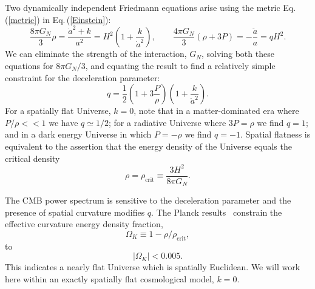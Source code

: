 \documentclass[universe,article,submit,moreauthors,pdftex,a4paper]{Definitions/mdpi}
\newcommand{\beqn}{\begin{equation}}
\newcommand{\eeqn}{\end{equation}}
\newcommand{\req}[1]{Eq.\,(\ref{#1})}
\begin{document}
Two dynamically independent Friedmann equations \cite{weinberg1972gravitation} arise using the metric \req{metric} in \req{Einstein}:
\beqn\label{hubble}
\frac{8\pi G_N}{3} \rho =  \frac{\dot a^2+k}{a^2}
=H^2\left( 1+\frac { k }{\dot a^2}\right),
\qquad
\frac{4\pi G_N}{3} (\rho+3P)  =-\frac{\ddot a}{a}=qH^2.
\eeqn
We can eliminate the strength of the interaction, $G_N$,  solving both these equations for ${8\pi G_N}/{3}$, and equating the result to find a relatively simple constraint for the deceleration parameter:
\beqn\label{qparam}
q=\frac 1 2 \left(1+3\frac{P}{\rho}\right)\left(1+\frac{k}{\dot a^2}\right).
\eeqn
For a spatially flat Universe, $k=0$, note that in a  matter-dominated era where $P/\rho<<1$ we have $q\simeq 1/2$; for a radiative Universe where $3P=\rho$ we find $q= 1 $; and  in a dark energy Universe in which $P=-\rho$  we find $q=-1$.  Spatial flatness is equivalent to the assertion that the energy density of the Universe equals the critical density
\begin{equation}\label{crit_density}
\rho=\rho_{\text{crit}}\equiv \frac{3H^2}{8\pi G_N}.
\end{equation}

 The CMB power spectrum is sensitive to the  deceleration parameter  and the presence of spatial curvature modifies $q$. The Planck results~\cite{Planck:2013pxb,Planck:2015fie,Planck:2018vyg} constrain  the effective curvature energy density fraction,
\begin{equation}
\Omega_K\equiv1-\rho/\rho_{\text{crit}},
\end{equation}
to
\begin{equation}
|\Omega_K|<0.005.
\end{equation}
This indicates a nearly flat Universe which is spatially Euclidean. We will work here within an exactly spatially flat cosmological model, $k=0$.  
\end{document}
